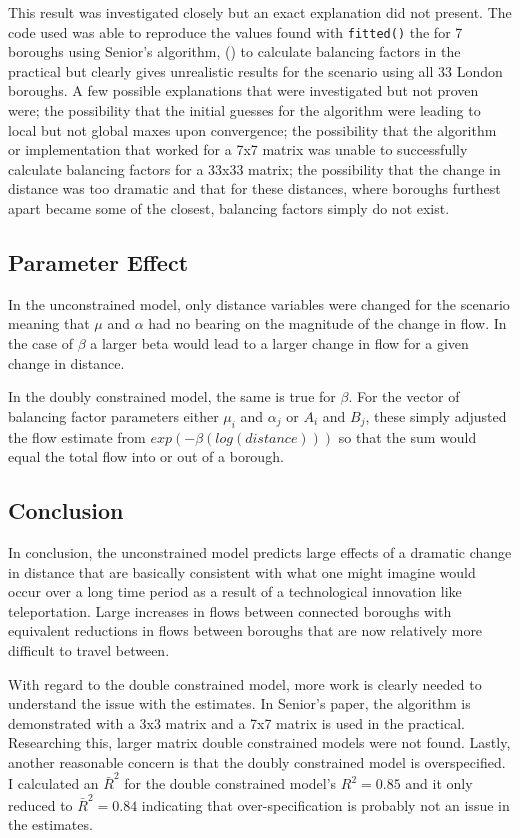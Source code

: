 \documentclass[11pt]{article} %
\begin{document}
This result was investigated closely but an exact explanation did not present. The code used was able to reproduce the values found with \verb!fitted()! the  for 7 boroughs using Senior's algorithm, (\cite{senior1979gravity}) to calculate balancing factors in the practical but clearly gives unrealistic results for the scenario using all 33 London boroughs. A few possible explanations that were investigated but not proven were; the possibility that the initial guesses for the algorithm were leading to local but not global maxes upon convergence; the possibility that the algorithm or implementation that worked for a 7x7 matrix was unable to successfully calculate balancing factors for a 33x33 matrix; the possibility that the change in distance was too dramatic and that for these distances, where boroughs furthest apart became some of the closest, balancing factors simply do not exist. 

\subsection{Parameter Effect}

In the unconstrained model, only distance variables were changed for the scenario meaning that $\mu$ and $\alpha$ had no bearing on the magnitude of the change in flow. In the case of $\beta$ a larger beta would lead to a larger change in flow for a given change in distance. 

In the doubly constrained model, the same is true for $\beta$. For the vector of balancing factor parameters either $\mu_i$ and $\alpha_j$ or $A_i$ and $B_j$, these simply adjusted the flow estimate from $exp(-\beta (log(distance)))$ so that the sum would equal the total flow into or out of a borough. 

\subsection{Conclusion}

In conclusion, the unconstrained model predicts large effects of a dramatic change in distance that are basically consistent with what one might imagine would occur over a long time period as a result of a technological innovation like teleportation. Large increases in flows between connected boroughs with equivalent reductions in flows between boroughs that are now relatively more difficult to travel between. 

With regard to the double constrained model, more work is clearly needed to understand the issue with the estimates. In Senior's paper, the algorithm is demonstrated with a 3x3 matrix and a 7x7 matrix is used in the practical. Researching this, larger matrix double constrained models were not found. Lastly, another reasonable concern is that the doubly constrained model is overspecified. I calculated an  $\bar{R}^2$ for the double constrained model's $R^2 = 0.85$ and it only reduced to $\bar{R}^2 = 0.84$ indicating that over-specification is probably not an issue in the estimates.  
\end{document}
